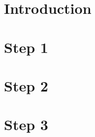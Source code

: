 \documentclass[11pt]{article}
\begin{document}
\setlength\parindent{0pt}
\onehalfspacing


\tableofcontents
\newpage

\section{Introduction}

\newpage

\section{Step 1}

\newpage

\section{Step 2}

\newpage

\section{Step 3}

\newpage
\end{document}

